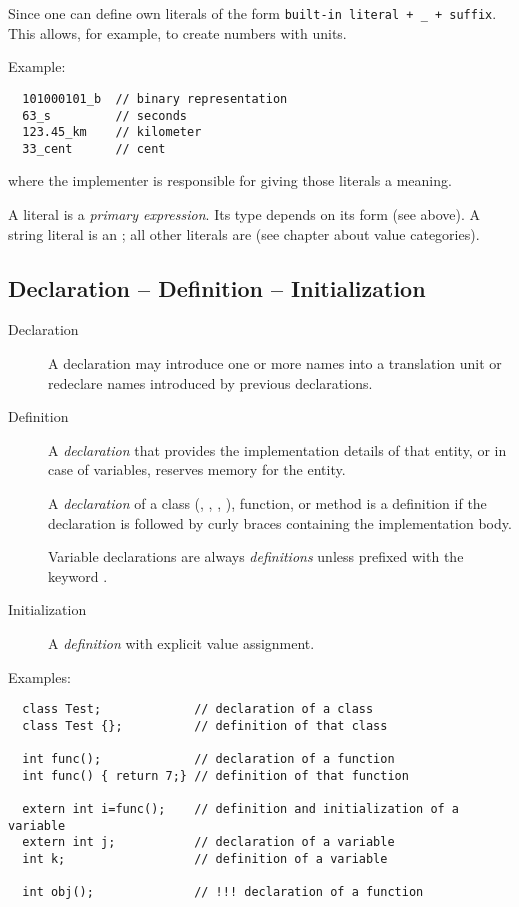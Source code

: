 \begin{rem}
  Since\marginpar{[\cxx11]}  one can define own literals of the form \texttt{built-in literal + \_ + suffix}. This allows, for example, to create numbers with units.

Example:
\begin{verbatim}
  101000101_b  // binary representation
  63_s         // seconds
  123.45_km    // kilometer
  33_cent      // cent
\end{verbatim}

where the implementer is responsible for giving those literals a meaning.
\end{rem}

\begin{rem}
  A literal is a \textit{primary expression}. Its type depends on its form (see above). A string literal is an ; all other literals are  (see chapter about value categories).
\end{rem}


\subsection{Declaration -- Definition -- Initialization}
\begin{description}
  \item[Declaration] A declaration may introduce one or more names into a translation unit or redeclare names introduced by previous declarations.

  \item[Definition] A \textit{declaration} that provides the implementation details of that entity, or in case of variables, reserves memory for the entity.

  A \textit{declaration} of a class (, , , ), function, or method is a definition if the declaration is followed by curly braces containing the implementation body.

  Variable declarations are always \textit{definitions} unless prefixed with the keyword .

  \item[Initialization] A \textit{definition} with explicit value assignment.
\end{description}

Examples:
\begin{verbatim}
  class Test;             // declaration of a class
  class Test {};          // definition of that class

  int func();             // declaration of a function
  int func() { return 7;} // definition of that function

  extern int i=func();    // definition and initialization of a variable
  extern int j;           // declaration of a variable
  int k;                  // definition of a variable

  int obj();              // !!! declaration of a function
\end{verbatim}

